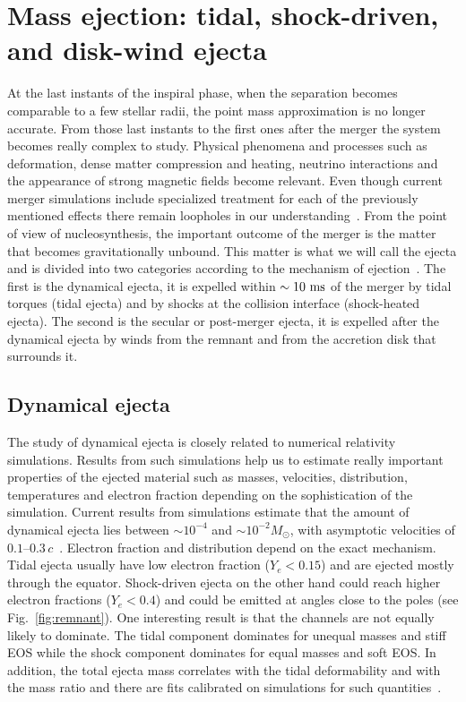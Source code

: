 \section{Mass ejection: tidal, shock-driven, and disk-wind ejecta}

At the last instants of the inspiral phase, when the separation becomes comparable to a few stellar radii, the point mass approximation is no longer accurate.
From those last instants to the first ones after the merger the system becomes really complex to study.
Physical phenomena and processes such as deformation, dense matter compression and heating, neutrino interactions and the appearance of strong magnetic fields become relevant.
Even though current merger simulations include specialized treatment for each of the previously mentioned effects there remain loopholes in our understanding~\cite{radice_dynamical_2016, radice_binary_2018}.
From the point of view of nucleosynthesis, the important outcome of the merger is the matter that becomes gravitationally unbound.
This matter is what we will call the ejecta and is divided into two categories according to the mechanism of ejection~\cite{metzger_kilonovae_2017}.
The first is the dynamical ejecta, it is expelled within $\sim10~\rm{ms}$ of the merger by tidal torques (tidal ejecta) and by shocks at the collision interface (shock-heated ejecta).
The second is the secular or post-merger ejecta, it is expelled after the dynamical ejecta by winds from the remnant and from the accretion disk that surrounds it.

\subsection{Dynamical ejecta}

The study of dynamical ejecta is closely related to numerical relativity simulations. 
Results from such simulations help us to estimate really important properties of the ejected material such as masses, velocities, distribution, temperatures and electron fraction depending on the sophistication of the simulation.
Current results from simulations estimate that the amount of dynamical ejecta lies between $\sim10^{-4}$ and $\sim10^{-2}M_\odot$, with asymptotic velocities of $0.1$--$0.3\,c$~\cite{radice_dynamics_2020}.
Electron fraction and distribution depend on the exact mechanism.
Tidal ejecta usually have low electron fraction ($Y_e<0.15$) and are ejected  mostly through the equator.
Shock-driven ejecta on the other hand could reach higher electron fractions ($Y_e<0.4$) and could be emitted at angles close to the poles (see Fig.~\ref{fig:remnant}).
One interesting result is that the channels are not equally likely to dominate.
The tidal component dominates for unequal masses and stiff EOS while the shock component dominates for equal masses and soft EOS. 
In addition, the total ejecta mass correlates with the tidal deformability and with the mass ratio and there are fits calibrated on simulations for such quantities~\cite{kruger_estimates_2020}.


